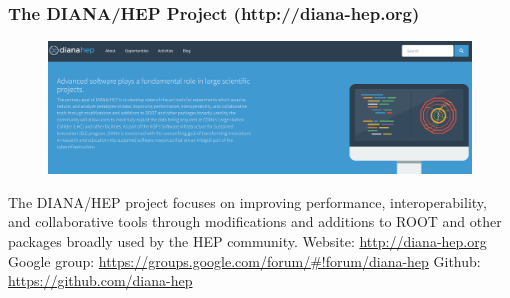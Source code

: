 \begin{frame}
\frametitle{The DIANA/HEP Project (http://diana-hep.org)}

\begin{figure}[htbp]
\begin{center}
\includegraphics[width=1.0\textwidth]{images/20160610-diana-hep-banner.png}
\end{center}
\end{figure}

\small{The DIANA/HEP project focuses on improving performance, interoperability, and collaborative tools through modifications and additions to ROOT and other packages broadly used by the HEP community.}
\vskip 0.15in
\small{Website: \url{http://diana-hep.org}}
\vskip 0.05in
\small{Google group: \url{https://groups.google.com/forum/\#!forum/diana-hep}}
\vskip 0.05in
\small{Github: \url{https://github.com/diana-hep}}

\end{frame}


